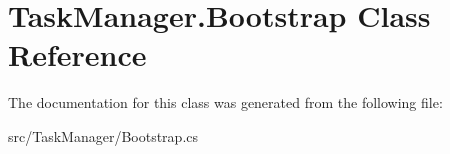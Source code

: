 \hypertarget{class_task_manager_1_1_bootstrap}{}\section{Task\+Manager.\+Bootstrap Class Reference}
\label{class_task_manager_1_1_bootstrap}


The documentation for this class was generated from the following file\+:\begin{DoxyCompactItemize}
\item 
src/\+Task\+Manager/Bootstrap.\+cs\end{DoxyCompactItemize}
